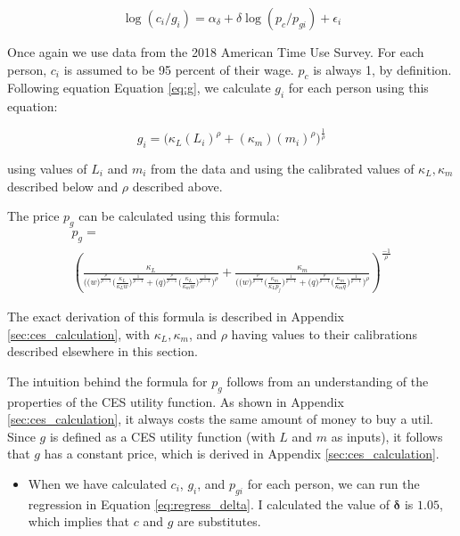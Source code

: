 \documentclass[letter, 12pt, epsf,leqno]{article}
\begin{document}
\begin{equation} \log(c_i/g_i) = \alpha_\delta + \delta \log(p_c/p_{gi})+\epsilon_i \label{eq:regress_delta}
\end{equation}

Once again we use data from the 2018 American Time Use Survey.  For each person, $c_i$ is assumed to be 95 percent of their wage.  $p_c$ is always 1, by definition.
Following equation Equation \ref{eq:g}, we calculate $g_i$ for each person using this equation:

\begin{equation}g_i= \Bigg(\kappa_L (L_i)^\rho + (\kappa_m) (m_i)^\rho\Bigg)^\frac{1}{\rho}\end{equation}

using values of $L_i$ and $m_i$ from the data and using the calibrated values of $\kappa_L, \kappa_m$ described below and $\rho$ described above.  %

The price $p_g$ can be calculated using this formula: 
\begin{gather}\nonumber p_g =\\ 
\left(  \frac{\kappa_L}{\Bigg( \Big(w\Big)^\frac{\rho}{\rho-1} \Big( \frac {\kappa_L }{\kappa_L w} \Big) ^\frac{1}{\rho-1} + \Big(q\Big)^\frac{\rho}{\rho-1} \Big( \frac {\kappa_L }{\kappa_m w} \Big) ^\frac{1}{\rho-1}\Bigg)^\rho}+   \frac{\kappa_m}{\Bigg( \Big(w\Big)^\frac{\rho}{\rho-1} \Big( \frac {\kappa_m }{\kappa_L p_j} \Big) ^\frac{1}{\rho-1} + \Big(q\Big)^\frac{\rho}{\rho-1} \Big( \frac {\kappa_m }{\kappa_m q} \Big) ^\frac{1}{\rho-1}\Bigg)^\rho}\right)^\frac{-1}{\rho} \end{gather}

The exact derivation of this formula is described in Appendix \ref{sec:ces_calculation}, with $\kappa_L, \kappa_m$, and $\rho$ having values to their calibrations described elsewhere in this section.  

The intuition behind the formula for $p_g$ follows from an understanding of the properties of the CES utility function.  As shown in Appendix \ref{sec:ces_calculation}, it always costs the same amount of money to buy a util.  Since $g$ is defined as a CES utility function (with $L$ and $m$ as inputs), it follows that $g$ has a constant price, which is derived in Appendix \ref{sec:ces_calculation}.

\begin{itemize}
\item When we have calculated $c_i$, $g_i$, and $p_{gi}$ for each person, we can run the regression in Equation \ref{eq:regress_delta}.  I calculated the value of $\boldsymbol{\delta}$ is  $\boldsymbol{1.05}$, which implies that $c$ and $g$ are substitutes.%
\end{itemize}
\end{document}
